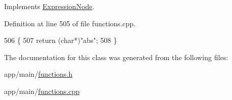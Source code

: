 Implements \hyperlink{classExpressionNode_a42a5e9562b0f645a19dcc83f698069b5}{Expression\+Node}.



Definition at line 505 of file functions.\+cpp.


\begin{DoxyCode}
506 \{
507     \textcolor{keywordflow}{return} (\textcolor{keywordtype}{char}*)\textcolor{stringliteral}{"abs"};
508 \}
\end{DoxyCode}


The documentation for this class was generated from the following files\+:\begin{DoxyCompactItemize}
\item 
app/main/\hyperlink{functions_8h}{functions.\+h}\item 
app/main/\hyperlink{functions_8cpp}{functions.\+cpp}\end{DoxyCompactItemize}
